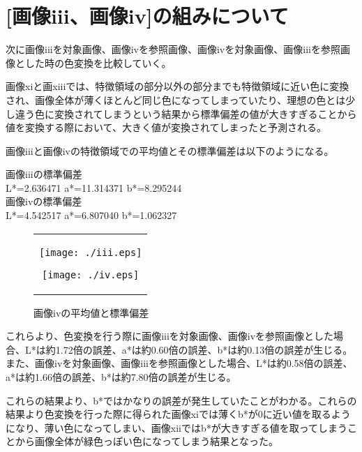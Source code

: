 \section{[画像iii、画像iv]の組みについて}
次に画像iiiを対象画像、画像ivを参照画像、画像ivを対象画像、画像iiiを参照画像とした時の色変換を比較していく。\par
画像xiと画xiiiでは、特徴領域の部分以外の部分までも特徴領域に近い色に変換され、画像全体が薄くほとんど同じ色になってしまっていたり、理想の色とは少し違う色に変換されてしまうという結果から標準偏差の値が大きすぎることから値を変換する際において、大きく値が変換されてしまったと予測される。\par
画像iiiと画像ivの特徴領域での平均値とその標準偏差は以下のようになる。
\begin{screen}
画像iiiの標準偏差\\
L*=2.636471 a*=11.314371 b*=8.295244\\
画像ivの標準偏差\\
L*=4.542517 a*=6.807040 b*=1.062327
  \end{screen}
\begin{figure}[htbp]
  \begin{center}
    \begin{tabular}{c}

      \begin{minipage}{0.45\hsize}
        \begin{center}
          \texttt{[image: ./iii.eps]}
          \caption{画像iiiの平均値と標準偏差}
          \label{fig:seininhsv}
        \end{center}
      \end{minipage}

      \begin{minipage}{0.45\hsize}
        \begin{center}
          \texttt{[image: ./iv.eps]}
          \caption{画像ivの平均値と標準偏差}
          \label{fig:kinninhsv}
        \end{center}
      \end{minipage}


    \end{tabular}
  \end{center}
\end{figure}
\par
これらより、色変換を行う際に画像iiiを対象画像、画像ivを参照画像とした場合、L*は約1.72倍の誤差、a*は約0.60倍の誤差、b*は約0.13倍の誤差が生じる。また、画像ivを対象画像、画像iiiを参照画像とした場合、L*は約0.58倍の誤差、a*は約1.66倍の誤差、b*は約7.80倍の誤差が生じる。\par
これらの結果より、b*ではかなりの誤差が発生していたことがわかる。これらの結果より色変換を行った際に得られた画像xiでは薄くb*が0に近い値を取るようになり、薄い色になってしまい、画像xiiではb*が大きすぎる値を取ってしまうことから画像全体が緑色っぽい色になってしまう結果となった。\par

